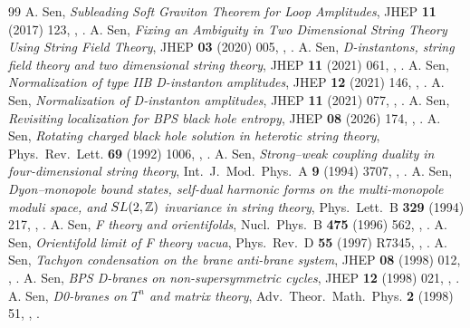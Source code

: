 \begin{thebibliography}{99}
 A. Sen, \emph{Subleading Soft Graviton Theorem for Loop Amplitudes}, JHEP \textbf{11} (2017) 123, , .
 A. Sen, \emph{Fixing an Ambiguity in Two Dimensional String Theory Using String Field Theory}, JHEP \textbf{03} (2020) 005, , .
 A. Sen, \emph{D-instantons, string field theory and two dimensional string theory}, JHEP \textbf{11} (2021) 061, , .
 A. Sen, \emph{Normalization of type IIB D-instanton amplitudes}, JHEP \textbf{12} (2021) 146, , .
 A. Sen, \emph{Normalization of D-instanton amplitudes}, JHEP \textbf{11} (2021) 077, , .
 A. Sen, \emph{Revisiting localization for BPS black hole entropy}, JHEP \textbf{08} (2026) 174, , .
 A. Sen, \emph{Rotating charged black hole solution in heterotic string theory}, Phys.\ Rev.\ Lett. \textbf{69} (1992) 1006, , .
 A. Sen, \emph{Strong--weak coupling duality in four-dimensional string theory}, Int.\ J.\ Mod.\ Phys.\ A \textbf{9} (1994) 3707, , .
 A. Sen, \emph{Dyon--monopole bound states, self-dual harmonic forms on the multi-monopole moduli space, and $SL(2,\mathbb{Z})$ invariance in string theory}, Phys.\ Lett.\ B \textbf{329} (1994) 217, , .
 A. Sen, \emph{F theory and orientifolds}, Nucl.\ Phys.\ B \textbf{475} (1996) 562, , .
 A. Sen, \emph{Orientifold limit of F theory vacua}, Phys.\ Rev.\ D \textbf{55} (1997) R7345, , .
 A. Sen, \emph{Tachyon condensation on the brane anti-brane system}, JHEP \textbf{08} (1998) 012, , .
 A. Sen, \emph{BPS D-branes on non-supersymmetric cycles}, JHEP \textbf{12} (1998) 021, , .
 A. Sen, \emph{D0-branes on $T^n$ and matrix theory}, Adv.\ Theor.\ Math.\ Phys. \textbf{2} (1998) 51, , .

\end{thebibliography}
